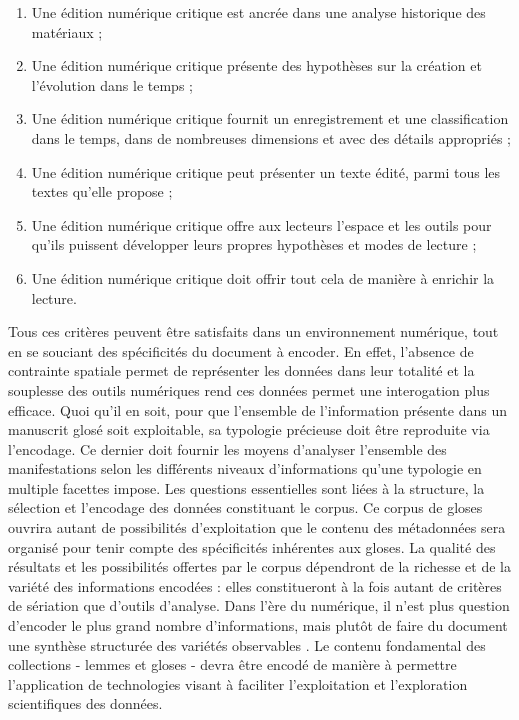 \documentclass[a4paper, twoside, 12pt]{book}
\begin{document}
\begin{enumerate}
  \item Une édition numérique critique est ancrée dans une analyse historique des matériaux ;
  \item Une édition numérique critique présente des hypothèses sur la création et l’évolution dans le temps ;
  \item Une édition numérique critique fournit un enregistrement et une classification dans le temps, dans de nombreuses dimensions et avec des détails appropriés ;
  \item Une édition numérique critique peut présenter un texte édité, parmi tous les textes qu'elle propose ;
  \item Une édition numérique critique offre aux lecteurs l’espace et les outils pour qu’ils puissent développer leurs propres hypothèses et modes de lecture ;
  \item Une édition numérique critique doit offrir tout cela de manière à enrichir la lecture.
\end{enumerate}

Tous ces critères peuvent être satisfaits dans un environnement numérique, tout en se souciant des spécificités du document à encoder. En effet, l’absence de contrainte spatiale permet de représenter les données dans leur totalité et la souplesse des outils numériques rend ces données permet une interogation plus efficace. Quoi qu'il en soit, pour que l'ensemble de l'information présente dans un manuscrit glosé soit exploitable, sa typologie précieuse doit être reproduite via l'encodage. Ce dernier doit fournir les moyens d’analyser l’ensemble des manifestations selon les différents niveaux d’informations qu'une typologie en \og{} multiple facettes \fg{} impose. Les questions essentielles sont liées à la structure, la sélection et l'encodage des données constituant le corpus. Ce corpus de gloses ouvrira autant de possibilités d'exploitation que le contenu des métadonnées sera organisé pour tenir compte des spécificités inhérentes aux gloses. La qualité des résultats et les possibilités offertes par le corpus dépendront de la richesse et de la variété des informations encodées : elles constitueront à la fois autant de critères de sériation que d'outils d'analyse. Dans l'ère du numérique, il n'est plus question d'encoder le plus grand nombre d'informations, mais plutôt de faire du document \og{} une synthèse structurée des variétés observables \fg{}. Le contenu fondamental des collections - lemmes et gloses - devra être encodé de manière à permettre l'application de technologies visant à faciliter l'exploitation et l'exploration scientifiques des données. 
\end{document}
